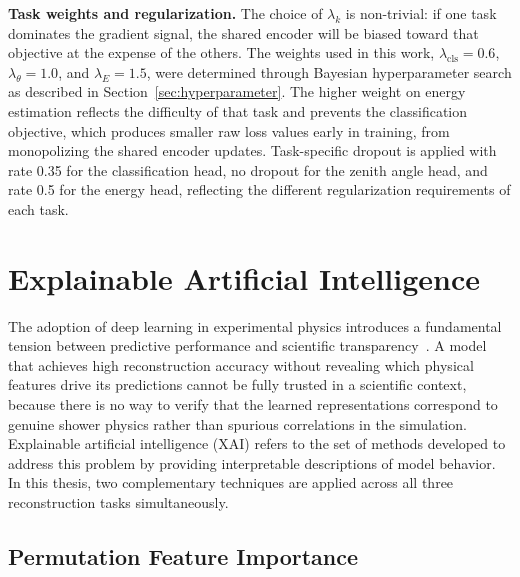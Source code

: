 \textbf{Task weights and regularization.} The choice of $\lambda_k$ is non-trivial: if one task dominates the gradient signal, the shared encoder will be biased toward that objective at the expense of the others. The weights used in this work, $\lambda_\text{cls} = 0.6$, $\lambda_\theta = 1.0$, and $\lambda_E = 1.5$, were determined through Bayesian hyperparameter search as described in Section~\ref{sec:hyperparameter}. The higher weight on energy estimation reflects the difficulty of that task and prevents the classification objective, which produces smaller raw loss values early in training, from monopolizing the shared encoder updates. Task-specific dropout is applied with rate 0.35 for the classification head, no dropout for the zenith angle head, and rate 0.5 for the energy head, reflecting the different regularization requirements of each task.

\section{Explainable Artificial Intelligence}

The adoption of deep learning in experimental physics introduces a fundamental tension between predictive performance and scientific transparency~. A model that achieves high reconstruction accuracy without revealing which physical features drive its predictions cannot be fully trusted in a scientific context, because there is no way to verify that the learned representations correspond to genuine shower physics rather than spurious correlations in the simulation. Explainable artificial intelligence (XAI) refers to the set of methods developed to address this problem by providing interpretable descriptions of model behavior. In this thesis, two complementary techniques are applied across all three reconstruction tasks simultaneously.

\subsection{Permutation Feature Importance}

